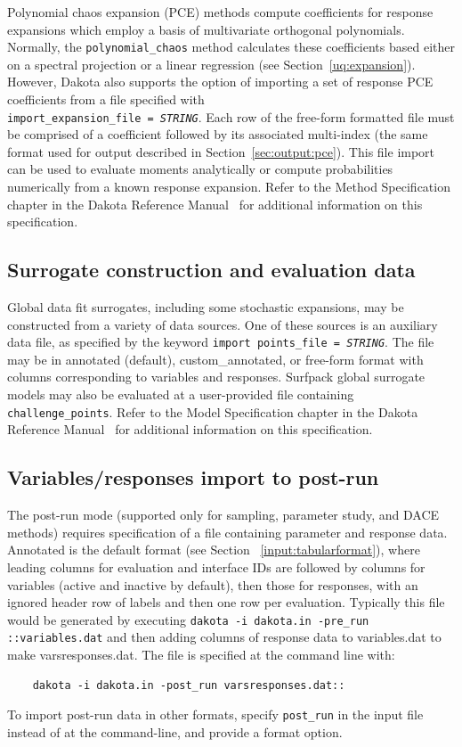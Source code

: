 Polynomial chaos expansion (PCE) methods compute coefficients for
response expansions which employ a basis of multivariate orthogonal
polynomials.  Normally, the \texttt{polynomial\_chaos} method
calculates these coefficients based either on a spectral projection or
a linear regression (see Section~\ref{uq:expansion}).  However, Dakota
also supports the option of importing a set of response PCE
coefficients from a file specified with \\
\texttt{import\_expansion\_file = \emph{STRING}}.  Each row of the
free-form formatted file must be comprised of a coefficient followed
by its associated multi-index (the same format used for output
described in Section~\ref{sec:output:pce}).  This file import can be
used to evaluate moments analytically or compute probabilities
numerically from a known response expansion.  Refer to the Method
Specification chapter in the Dakota Reference Manual~\cite{RefMan} for
additional information on this specification.

\subsection{Surrogate construction and evaluation data}

Global data fit surrogates, including some stochastic expansions, may
be constructed from a variety of data sources.  One of these sources
is an auxiliary data file, as specified by the keyword \texttt{import\
  points\_file = \emph{STRING}}.  The file may be in annotated
(default), custom\_annotated, or free-form format with columns
corresponding to variables and responses.  Surfpack global surrogate
models may also be evaluated at a user-provided file containing
\texttt{challenge\_points}.  Refer to the Model Specification chapter
in the Dakota Reference Manual~\cite{RefMan} for additional
information on this specification.

\subsection{Variables/responses import to post-run}

The post-run mode (supported only for sampling, parameter study, and
DACE methods) requires specification of a file containing parameter
and response data.  Annotated is the default format (see Section
~\ref{input:tabularformat}), where leading columns for evaluation and
interface IDs are followed by columns for variables (active and
inactive by default), then those for responses, with an ignored header
row of labels and then one row per evaluation.  Typically this file
would be generated by executing \texttt{dakota -i dakota.in -pre\_run
  ::variables.dat} and then adding columns of response data to
variables.dat to make varsresponses.dat.  The file is specified at the
command line with:
\begin{small}
\begin{verbatim}
    dakota -i dakota.in -post_run varsresponses.dat::
\end{verbatim}
\end{small}
To import post-run data in other formats, specify \texttt{post\_run}
in the input file instead of at the command-line, and provide a format
option.

